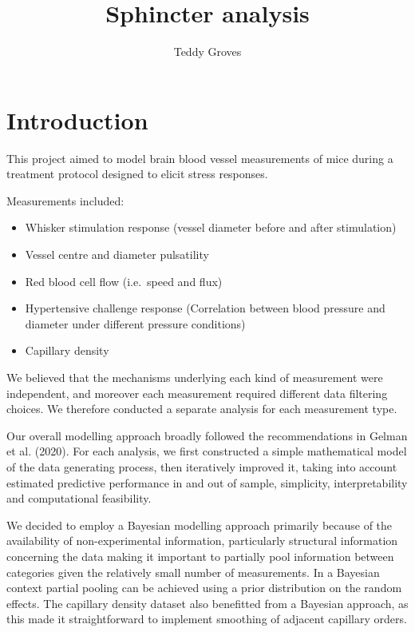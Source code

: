 \documentclass[
  letterpaper,
  DIV=11,
  numbers=noendperiod,
  oneside]{scrartcl}
\title{Sphincter analysis}
\author{Teddy Groves}
\date{}
\providecommand{\tightlist}{%
  \setlength{\itemsep}{0pt}\setlength{\parskip}{0pt}}\usepackage{longtable,booktabs,array}
\renewcommand*\contentsname{Table of contents}
\newcommand\contentsname{Table of contents}
\theoremstyle{plain}
\theoremstyle{remark}
\begin{document}
\maketitle

\renewcommand*\contentsname{Table of contents}
{
\hypersetup{linkcolor=}
\setcounter{tocdepth}{3}
\tableofcontents
}
\section{Introduction}\label{introduction}

This project aimed to model brain blood vessel measurements of mice
during a treatment protocol designed to elicit stress responses.

Measurements included:

\begin{itemize}
\tightlist
\item
  Whisker stimulation response (vessel diameter before and after
  stimulation)
\item
  Vessel centre and diameter pulsatility
\item
  Red blood cell flow (i.e.~speed and flux)
\item
  Hypertensive challenge response (Correlation between blood pressure
  and diameter under different pressure conditions)
\item
  Capillary density
\end{itemize}

We believed that the mechanisms underlying each kind of measurement were
independent, and moreover each measurement required different data
filtering choices. We therefore conducted a separate analysis for each
measurement type.

Our overall modelling approach broadly followed the recommendations in
Gelman et al. (2020). For each analysis, we first constructed a simple
mathematical model of the data generating process, then iteratively
improved it, taking into account estimated predictive performance in and
out of sample, simplicity, interpretability and computational
feasibility.

We decided to employ a Bayesian modelling approach primarily because of
the availability of non-experimental information, particularly
structural information concerning the data making it important to
partially pool information between categories given the relatively small
number of measurements. In a Bayesian context partial pooling can be
achieved using a prior distribution on the random effects. The capillary
density dataset also benefitted from a Bayesian approach, as this made
it straightforward to implement smoothing of adjacent capillary orders.
\end{document}
